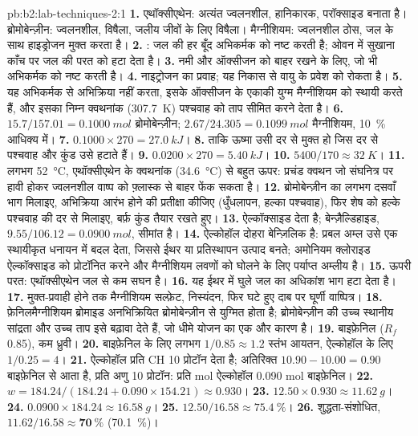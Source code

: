\begin{solution}{pb:b2:lab-techniques-2:1}
\textbf{1.} एथॉक्सीएथेन: अत्यंत ज्वलनशील, हानिकारक, परॉक्साइड बनाता है। ब्रोमोबेन्ज़ीन: ज्वलनशील, विषैला,
जलीय जीवों के लिए विषैला। मैग्नीशियम: ज्वलनशील ठोस, जल के साथ हाइड्रोजन मुक्त करता है।
\textbf{2.} : जल की हर बूँद अभिकर्मक को नष्ट करती है; ओवन में सुखाना
काँच पर जल की परत को हटा देता है।
\textbf{3.} नमी और ऑक्सीजन को बाहर रखने के लिए, जो भी अभिकर्मक को नष्ट करती है।
\textbf{4.} नाइट्रोजन का प्रवाह; यह निकास से वायु के प्रवेश को रोकता है।
\textbf{5.} यह अभिकर्मक से अभिक्रिया नहीं करता, इसके ऑक्सीजन के एकाकी युग्म मैग्नीशियम को स्थायी करते हैं, और इसका
निम्न क्वथनांक (\qty{307.7}{K}) पश्चवाह को ताप सीमित करने देता है।
\textbf{6.} $15.7/157.01 = \qty{0.1000}{mol}$ ब्रोमोबेन्ज़ीन; $2.67/24.305 = \qty{0.1099}{mol}$ मैग्नीशियम,
10~\% आधिक्य में।
\textbf{7.} $0.1000 \times 270 = \qty{27.0}{kJ}$।
\textbf{8.} ताकि ऊष्मा उसी दर से मुक्त हो जिस दर से पश्चवाह और कुंड उसे हटाते हैं।
\textbf{9.} $0.0200 \times 270 = \qty{5.40}{kJ}$।
\textbf{10.} $5400/170 \approx \qty{32}{K}$।
\textbf{11.} लगभग \qty{52}{\degreeCelsius}, एथॉक्सीएथेन के क्वथनांक (\qty{34.6}{\degreeCelsius}) से बहुत ऊपर:
प्रचंड क्वथन जो संघनित्र पर हावी होकर ज्वलनशील वाष्प को
फ़्लास्क से बाहर फेंक सकता है।
\textbf{12.} ब्रोमोबेन्ज़ीन का लगभग दसवाँ भाग मिलाइए, अभिक्रिया आरंभ होने की प्रतीक्षा कीजिए (धुँधलापन, हल्का
पश्चवाह), फिर शेष को हल्के पश्चवाह की दर से मिलाइए, बर्फ़ कुंड तैयार रखते हुए।
\textbf{13.}  ऐल्कॉक्साइड  देता है; बेन्ज़ैल्डिहाइड,
$9.55/106.12 = \qty{0.0900}{mol}$, सीमांत है।
\textbf{14.} ऐल्कोहॉल दोहरा बेन्ज़िलिक है: प्रबल अम्ल उसे एक स्थायीकृत धनायन में बदल देता,
जिससे ईथर या प्रतिस्थापन उत्पाद बनते; अमोनियम क्लोराइड ऐल्कॉक्साइड को प्रोटॉनित करने
और मैग्नीशियम लवणों को घोलने के लिए पर्याप्त अम्लीय है।
\textbf{15.} ऊपरी परत: एथॉक्सीएथेन जल से कम सघन है।
\textbf{16.} यह ईथर में घुले जल का अधिकांश भाग हटा देता है।
\textbf{17.} मुक्त-प्रवाही होने तक मैग्नीशियम सल्फ़ेट, निस्यंदन, फिर घटे हुए दाब पर घूर्णी
वाष्पित्र।
\textbf{18.} फ़ेनिलमैग्नीशियम ब्रोमाइड अनभिक्रियित ब्रोमोबेन्ज़ीन से युग्मित होता है; ब्रोमोबेन्ज़ीन की उच्च स्थानीय सांद्रता
और उच्च ताप इसे बढ़ावा देते हैं, जो धीमे योजन का एक और कारण है।
\textbf{19.} बाइफ़ेनिल ($R_f$ 0.85), कम ध्रुवी।
\textbf{20.} बाइफ़ेनिल के लिए लगभग $1/0.85 \approx 1.2$ स्तंभ आयतन, ऐल्कोहॉल के लिए $1/0.25 = 4$।
\textbf{21.} ऐल्कोहॉल प्रति CH 10  प्रोटॉन देता है; अतिरिक्त $10.90 - 10.00 = 0.90$
बाइफ़ेनिल से आता है, प्रति अणु 10 प्रोटॉन: प्रति mol ऐल्कोहॉल 0.090 mol बाइफ़ेनिल।
\textbf{22.} $w = 184.24/(184.24 + 0.090 \times 154.21) \approx 0.930$।
\textbf{23.} $12.50 \times 0.930 \approx \qty{11.62}{g}$।
\textbf{24.} $0.0900 \times 184.24 \approx \qty{16.58}{g}$।
\textbf{25.} $12.50/16.58 \approx 75.4~\%$।
\textbf{26.} शुद्धता-संशोधित, $11.62/16.58 \approx \boldsymbol{70~\%}$ (70.1~\%)।
\end{solution}
